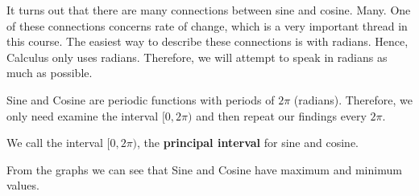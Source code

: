 \documentclass{ximera}
\begin{document}
\begin{warning}
It turns out that there are many connections between sine and cosine. Many. One of these connections concerns rate of change, which is a very important thread in this course.  The easiest way to describe these connections is with radians. Hence, Calculus only uses radians. Therefore, we will attempt to speak in radians as much as possible.
\end{warning}








Sine and Cosine are periodic functions with periods of $2\pi$ (radians). Therefore, we only need examine the interval $[0, 2\pi)$ and then repeat our findings every $2\pi$. 


We call the interval $[0, 2\pi)$, the \textbf{principal interval} for sine and cosine. 

From the graphs we can see that Sine and Cosine have maximum and minimum values.
\end{document}
